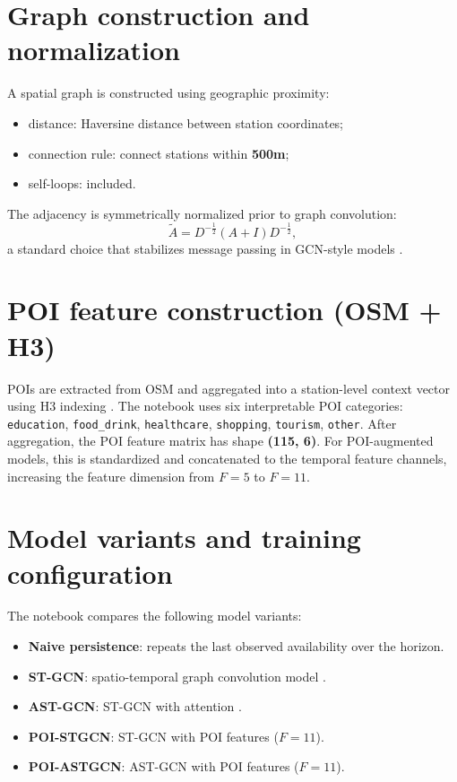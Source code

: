 \documentclass[11pt]{report}
\begin{document}
\section{Graph construction and normalization}
A spatial graph is constructed using geographic proximity:
\begin{itemize}
    \item distance: Haversine distance between station coordinates;
    \item connection rule: connect stations within \textbf{500m};
    \item self-loops: included.
\end{itemize}

The adjacency is symmetrically normalized prior to graph convolution:
\[
\tilde{A} = D^{-\frac12}(A+I)D^{-\frac12},
\]
a standard choice that stabilizes message passing in GCN-style models \cite{kipf2017gcn}.

\section{POI feature construction (OSM + H3)}
POIs are extracted from OSM and aggregated into a station-level context vector using H3 indexing \cite{h3_docs}. The notebook uses six interpretable POI categories:
\texttt{education}, \texttt{food\_drink}, \texttt{healthcare}, \texttt{shopping}, \texttt{tourism}, \texttt{other}.
After aggregation, the POI feature matrix has shape \textbf{(115, 6)}. For POI-augmented models, this is standardized and concatenated to the temporal feature channels, increasing the feature dimension from $F=5$ to $F=11$.

\section{Model variants and training configuration}
The notebook compares the following model variants:
\begin{itemize}
    \item \textbf{Naive persistence}: repeats the last observed availability over the horizon.
    \item \textbf{ST-GCN}: spatio-temporal graph convolution model \cite{yu2018stgcn}.
    \item \textbf{AST-GCN}: ST-GCN with attention \cite{guo2019astgcn}.
    \item \textbf{POI-STGCN}: ST-GCN with POI features ($F=11$).
    \item \textbf{POI-ASTGCN}: AST-GCN with POI features ($F=11$).
\end{itemize}
\end{document}
